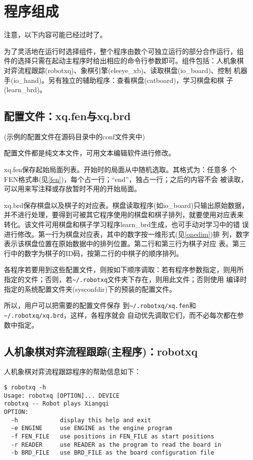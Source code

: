 \documentclass[a4paper]{article}
\begin{document}
\section{程序组成}
注意，以下内容可能已经过时了。

为了灵活地在运行时选择组件，整个程序由数个可独立运行的部分合作运行，组
件的选择只需在起动主程序时给出相应的命令行参数即可。组件包括：人机象棋
对弈流程跟踪(robotxq)、象棋引擎(eleeye\_xb)、读取棋盘(io\_board)、控制
机器手(io\_hand)。另有独立的辅助程序：查看棋盘(catboard)，学习棋盘和棋
子(learn\_brd)。

\subsection{配置文件：xq.fen与xq.brd}
\label{conf}
(示例的配置文件在源码目录中的conf文件夹中)

配置文件都是纯文本文件，可用文本编辑软件进行修改。

xq.fen保存起始局面列表。开始时的局面从中随机选取。其格式为：任意多
个FEN格式串(见\ref{fen})，每个占一行；``end''，独占一行；之后的内容不会
被读取，可以用来写注释或存放暂时不用的开始局面。

xq.brd保存棋盘以及棋子的对应表。棋盘读取程序(如io\_board)只输出原始数据，
并不进行处理，要得到可被其它程序使用的棋盘和棋子排列，就要使用对应表来
转化。该文件可用棋盘和棋子学习程序learn\_brd生成，也可手动对学习中的错
误进行修改。第一行为棋盘对应表，其中的数字按一维形式(见\ref{onedim})排
列，数字表示该棋盘位置在原始数据中的排列位置。第二行和第三行为棋子对应
表。第三行中的数字为棋子的ID码，按第二行的中棋子的顺序排列。

各程序若要用到这些配置文件，则按如下顺序调取：若有程序参数指定，则用所
指定的文件；否则，若\verb|~/.robotxq|文件夹下存在，则用此文件；否则使用
编译时指定的系统配置文件夹(sysconfdir)下的预装的配置文件。

所以，用户可以把需要的配置文件保存
到\verb|~/.robotxq/xq.fen|和\verb|~/.robotxq/xq.brd|，这样，各程序就会
自动优先调取它们，而不必每次都在参数中指定。

\subsection{人机象棋对弈流程跟踪(主程序)：robotxq}
人机象棋对弈流程跟踪程序的帮助信息如下：
\begin{verbatim}
$ robotxq -h
Usage: robotxq [OPTION]... DEVICE
robotxq -- Robot plays Xiangqi
OPTION:
  -h            display this help and exit
  -e ENGINE     use ENGINE as the engine program
  -f FEN_FILE   use positions in FEN_FILE as start positions
  -r READER     use READER as the program to read the board in
  -b BRD_FILE   use BRD_FILE as the board configuration file
\end{verbatim}
\end{document}
